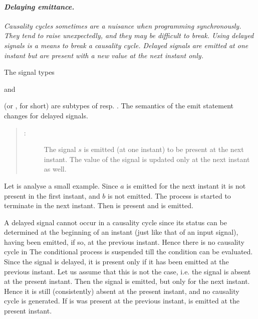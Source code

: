 \paragraph{\textit{Delaying emittance.}} 
{\em Causality cycles sometimes are a nuisance when programming 
synchronously.  They tend to raise unexpectedly, and they may be 
difficult to break. Using \emph{delayed signals}
 is a means to break 
a causality cycle. Delayed signals are emitted at \emph{one} instant 
but are present with a new value at the \emph{next} instant only. 

The signal types
\begin{center}
    \emph{} \quad and \quad 
\emph{}
\end{center}
(or \emph{}, \emph{} for short) are subtypes of \emph{} resp. \emph{}. The semantics of the emit statement changes for delayed signals. 
\begin{quote}

\begin{description}
\item[ :] The signal $s$ is emitted (at one instant) to be 
present at the next instant. The value of the signal is updated only at the 
next instant as well.
\end{description}

\end{quote}

Let is analyse a small example.
% 
% 
Since $a$ is emitted for the next instant it is not present in the 
first instant, and $b$ is not emitted. The \emph{} process 
is started to terminate in the next instant. Then \emph{} is 
present and \emph{} is emitted.

A delayed signal cannot occur in a causality cycle since its status 
can be
determined at the beginning of an instant (just like that of an input
signal), having been emitted, if so, at the previous instant. Hence
there is no causality cycle in
%
%
The conditional process is suspended till the condition can be 
evaluated. Since the signal \emph{} is delayed, it is present 
only if it has been emitted at the previous instant. Let us assume 
that this is not the case, i.e. the signal \emph{} is absent at 
the present instant. Then the signal \emph{} is emitted, but 
only for the next instant. Hence it is still (consistently) absent at 
the present instant, and no causality cycle is generated. If is was 
present at the previous instant, \emph{} is emitted at the 
present instant.

}
